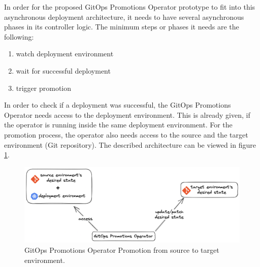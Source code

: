 In order for the proposed GitOps Promotions Operator prototype to fit into
this asynchronous deployment architecture,
it needs to have several asynchronous phases in its controller logic.
The minimum steps or phases it needs are the following:

\begin{enumerate}
	\item watch deployment environment
	\item wait for successful deployment
	\item trigger promotion
\end{enumerate}

In order to check if a deployment was successful,
the GitOps Promotions Operator needs access to the deployment environment. This is already given,
if the operator is running inside the same deployment environment.
For the promotion process, the operator also needs access
to the source and the target
environment (Git repository).
The described architecture can be viewed in figure \ref{fig:operator-access-source-target-envs}.

\begin{figure}[h]
	\centering
	\includegraphics[width=1.00\linewidth]{assets/operator-access-source-target-envs.png}
	\caption{GitOps Promotions Operator Promotion from source to target environment.
	}
	\label{fig:operator-access-source-target-envs}	
\end{figure}

%
%
%

